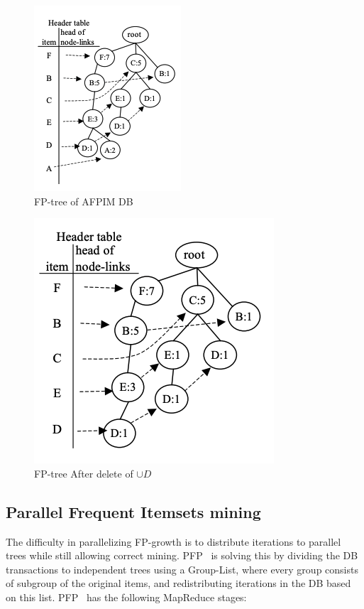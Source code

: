 \begin{figure}
  \centering
  \includegraphics[scale=0.75]{figures/AFPIMBase}
  \caption{FP-tree of AFPIM DB}
  \label{fig:AFPIMBase}
\end{figure}

\begin{figure}
  \centering
  \includegraphics[scale=0.75]{figures/AFMPIAfterDelete}
  \caption{FP-tree After delete of $ \cup D$}
  \label{fig:AFMPIAfterDelete}
\end{figure}


\subsection{Parallel Frequent Itemsets mining}
The difficulty in parallelizing FP-growth is to distribute iterations to parallel trees while still allowing correct mining. PFP~\cite{li2008pfp} is solving this by dividing the DB transactions to independent trees using a Group-List, where every group consists of subgroup of the original items, and redistributing iterations in the DB based on this list.
PFP~\cite{li2008pfp} has the following MapReduce stages:

